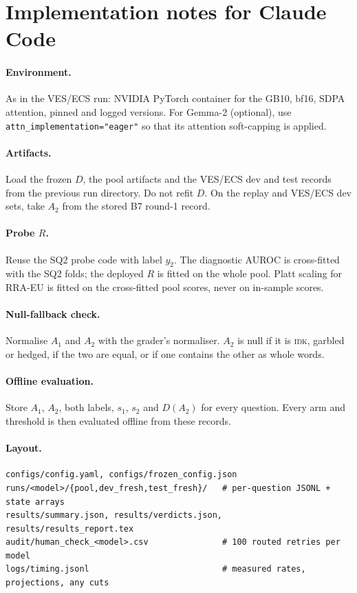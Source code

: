 \documentclass[11pt]{article}
\newcommand{\IDK}{\textsc{idk}}
\begin{document}
\section{Implementation notes for Claude Code}

\paragraph{Environment.} As in the VES/ECS run: NVIDIA PyTorch container for the GB10, bf16, SDPA attention,
pinned and logged versions. For Gemma-2 (optional), use \texttt{attn\_implementation="eager"} so that its
attention soft-capping is applied.

\paragraph{Artifacts.} Load the frozen $D$, the pool artifacts and the VES/ECS dev and test records from the
previous run directory. Do not refit $D$. On the replay and VES/ECS dev sets, take $A_2$ from the stored B7
round-1 record.

\paragraph{Probe $R$.} Reuse the SQ2 probe code with label $y_2$. The diagnostic AUROC is cross-fitted with the
SQ2 folds; the deployed $R$ is fitted on the whole pool. Platt scaling for RRA-EU is fitted on the cross-fitted
pool scores, never on in-sample scores.

\paragraph{Null-fallback check.} Normalise $A_1$ and $A_2$ with the grader's normaliser. $A_2$ is null if it is
\IDK, garbled or hedged, if the two are equal, or if one contains the other as whole words.

\paragraph{Offline evaluation.} Store $A_1$, $A_2$, both labels, $s_1$, $s_2$ and $D(A_2)$ for every question.
Every arm and threshold is then evaluated offline from these records.

\paragraph{Layout.}
\begin{verbatim}
configs/config.yaml, configs/frozen_config.json
runs/<model>/{pool,dev_fresh,test_fresh}/   # per-question JSONL + state arrays
results/summary.json, results/verdicts.json, results/results_report.tex
audit/human_check_<model>.csv               # 100 routed retries per model
logs/timing.jsonl                           # measured rates, projections, any cuts
\end{verbatim}
\end{document}
